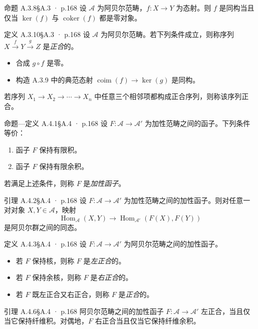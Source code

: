 \documentclass[UTF8,10pt,fontset=windows]{ctexart}
\newcommand{\Hom}{\operatorname{Hom}}\newcommand{\uHom}{\underline{\mathrm{Hom}}}
\newcommand{\coker}{\operatorname{coker}}\newcommand{\im}{\operatorname{im}}
\newcommand{\coim}{\operatorname{coim}}
\providecommand{\coim}{\operatorname{coim}}
\begin{document}
\begin{card}{命题 A.3.8}{§A.3 · p.168}
设 $\mathcal{A}$ 为阿贝尔范畴，$f:X\to Y$ 为态射。则 $f$ 是同构当且仅当 $\ker(f)$ 与 $\coker(f)$ 都是零对象。
\end{card}
\begin{card}{定义 A.3.10}{§A.3 · p.168}
设 $\mathcal{A}$ 为阿贝尔范畴。若下列条件成立，则称序列 $X\xrightarrow{f}Y\xrightarrow{g}Z$ 是\emph{正合}的。
\begin{itemize}[leftmargin=2em,itemsep=0.25ex]
  \item 合成 $g\circ f$ 是零。
  \item 构造 A.3.9 中的典范态射 $\coim(f)\to\ker(g)$ 是同构。
\end{itemize}
若序列 $X_1\to X_2\to\cdots\to X_n$ 中任意三个相邻项都构成正合序列，则称该序列正合。
\end{card}
\begin{card}{命题—定义 A.4.1}{§A.4 · p.168}
设 $F:\mathcal{A}\to\mathcal{A}'$ 为加性范畴之间的函子。下列条件等价：
\begin{enumerate}[label=(\roman*),leftmargin=2em,itemsep=0.25ex]
  \item 函子 $F$ 保持有限积。
  \item 函子 $F$ 保持有限余积。
\end{enumerate}
若满足上述条件，则称 $F$ 是\emph{加性函子}。
\end{card}
\begin{card}{引理 A.4.2}{§A.4 · p.168}
设 $F:\mathcal{A}\to\mathcal{A}'$ 为加性范畴之间的加性函子。则对任意一对对象 $X,Y\in\mathcal{A}$，映射
\[
\Hom_{\mathcal{A}}(X,Y)\to\Hom_{\mathcal{A}'}(F(X),F(Y))
\]
是阿贝尔群之间的同态。
\end{card}
\begin{card}{定义 A.4.3}{§A.4 · p.168}
设 $F:\mathcal{A}\to\mathcal{A}'$ 为阿贝尔范畴之间的加性函子。
\begin{itemize}[leftmargin=2em,itemsep=0.25ex]
  \item 若 $F$ 保持核，则称 $F$ 是\emph{左正合}的。
  \item 若 $F$ 保持余核，则称 $F$ 是\emph{右正合}的。
  \item 若 $F$ 既左正合又右正合，则称 $F$ 是\emph{正合}的。
\end{itemize}
\end{card}
\begin{card}{引理 A.4.6}{§A.4 · p.168}
阿贝尔范畴之间的加性函子 $F:\mathcal{A}\to\mathcal{A}'$ 左正合，当且仅当它保持纤维积。对偶地，$F$ 右正合当且仅当它保持纤维余积。
\end{card}
\end{document}
